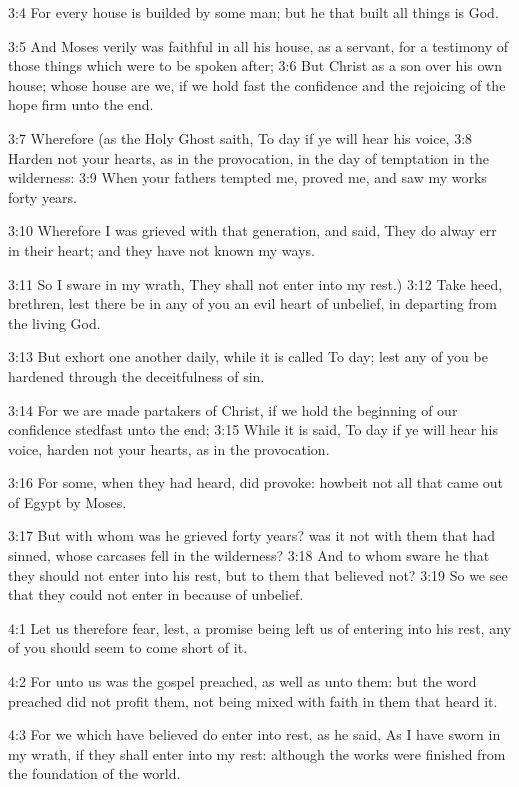 3:4 For every house is builded by some man; but he that built all
things is God.

3:5 And Moses verily was faithful in all his house, as a servant, for
a testimony of those things which were to be spoken after; 3:6 But
Christ as a son over his own house; whose house are we, if we hold
fast the confidence and the rejoicing of the hope firm unto the end.

3:7 Wherefore (as the Holy Ghost saith, To day if ye will hear his
voice, 3:8 Harden not your hearts, as in the provocation, in the day
of temptation in the wilderness: 3:9 When your fathers tempted me,
proved me, and saw my works forty years.

3:10 Wherefore I was grieved with that generation, and said, They do
alway err in their heart; and they have not known my ways.

3:11 So I sware in my wrath, They shall not enter into my rest.)  3:12
Take heed, brethren, lest there be in any of you an evil heart of
unbelief, in departing from the living God.

3:13 But exhort one another daily, while it is called To day; lest any
of you be hardened through the deceitfulness of sin.

3:14 For we are made partakers of Christ, if we hold the beginning of
our confidence stedfast unto the end; 3:15 While it is said, To day if
ye will hear his voice, harden not your hearts, as in the provocation.

3:16 For some, when they had heard, did provoke: howbeit not all that
came out of Egypt by Moses.

3:17 But with whom was he grieved forty years? was it not with them
that had sinned, whose carcases fell in the wilderness?  3:18 And to
whom sware he that they should not enter into his rest, but to them
that believed not?  3:19 So we see that they could not enter in
because of unbelief.

4:1 Let us therefore fear, lest, a promise being left us of entering
into his rest, any of you should seem to come short of it.

4:2 For unto us was the gospel preached, as well as unto them: but the
word preached did not profit them, not being mixed with faith in them
that heard it.

4:3 For we which have believed do enter into rest, as he said, As I
have sworn in my wrath, if they shall enter into my rest: although the
works were finished from the foundation of the world.

